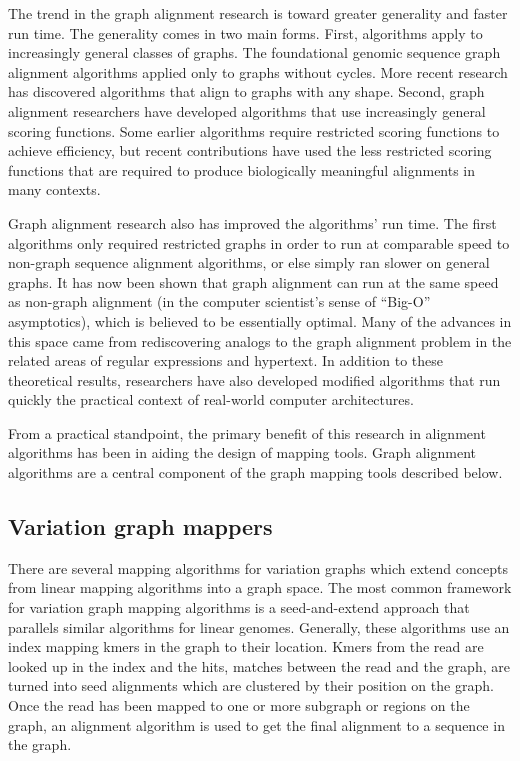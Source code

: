 The trend in the graph alignment research is toward greater generality and faster run time. 
The generality comes in two main forms. 
First, algorithms apply to increasingly general classes of graphs. 
The foundational genomic sequence graph alignment algorithms applied only to graphs without cycles\cite{Lee_2002, Grasso_2004}. 
More recent research has discovered algorithms that align to graphs with any shape\cite{Antipov_2015,Rautiainen_2017,Jain_2019a}. 
Second, graph alignment researchers have developed algorithms that use increasingly general scoring functions. 
Some earlier algorithms require restricted scoring functions to achieve efficiency\cite{Rautiainen_2017}, but recent contributions have used the less restricted scoring functions that are required to produce biologically meaningful alignments in many contexts\cite{Jain_2019a}.

Graph alignment research also has improved the algorithms' run time. 
The first algorithms only required restricted graphs in order to run at comparable speed to non-graph sequence alignment algorithms, or else simply ran slower on general graphs\cite{Lee_2002, Kavya_2019}. 
It has now been shown that graph alignment can run at the same speed as non-graph alignment (in the computer scientist's sense of ``Big-O'' asymptotics), which is believed to be essentially optimal\cite{Jain_2019a,Equi_2019}. 
Many of the advances in this space came from rediscovering analogs to the graph alignment problem in the related areas of regular expressions and hypertext\cite{Myers_1989,Amir_1997}. 
In addition to these theoretical results, researchers have also developed modified algorithms that run quickly the practical context of real-world computer architectures\cite{Suzuki_2018,Rautiainen_2019,Jain_2019b}.

From a practical standpoint, the primary benefit of this research in alignment algorithms has been in aiding the design of mapping tools. 
Graph alignment algorithms are a central component of the graph mapping tools described below.

\subsection{Variation graph mappers}
There are several mapping algorithms for variation graphs which extend concepts from linear mapping algorithms into a graph space.
The most common framework for variation graph mapping algorithms is a seed-and-extend approach that parallels similar algorithms for linear genomes.
Generally, these algorithms use an index mapping kmers in the graph to their location. 
Kmers from the read are looked up in the index and the hits, matches between the read and the graph, are turned into seed alignments which are clustered by their position on the graph.
Once the read has been mapped to one or more subgraph or regions on the graph, an alignment algorithm is used to get the final alignment to a sequence in the graph.

